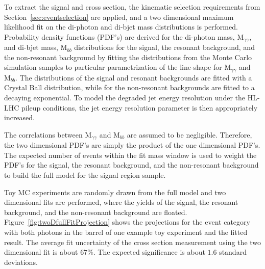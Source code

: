 To extract the signal and cross section, the kinematic selection requirements from Section~\ref{sec:eventselection} are applied, and  a two dimensional maximum
likelihood fit on the di-photon and di-bjet mass distributions is performed. Probability density functions (PDF's) are derived for the di-photon mass, $\mathrm{M}_{\gamma\gamma}$, and di-bjet mass, $\mathrm{M}_{bb}$
distributions for the signal, the resonant background, and the non-resonant background by 
fitting the distributions from the Monte Carlo simulation samples to particular parametrization 
of the line-shape for $\mathrm{M}_{\gamma\gamma}$ and $\mathrm{M}_{bb}$. The distributions of the signal and resonant backgrounds are fitted with a Crystal Ball distribution, while for
the non-resonant backgrounds are fitted to a decaying exponential. 
To model the degraded jet energy resolution under the HL-LHC pileup conditions, the jet energy resolution parameter is then appropriately increased.
 
The correlations between $\mathrm{M}_{\gamma\gamma}$ and $\mathrm{M}_{bb}$ are assumed to be negligible. Therefore, the two dimensional PDF's are simply the product of the one dimensional PDF's. The expected number of events within the fit mass window is used to weight the PDF's for the signal, the resonant background, and the non-resonant background to build the full model for the signal region sample. 

Toy MC experiments are randomly drawn from the full model and two dimensional fits are performed, where the yields of the signal, the resonant background, and the non-resonant background are floated.  Figure~\ref{fig:twoDfullFitProjection} shows the projections for the event category with both photons in the barrel of one example toy experiment and the fitted result. 
The average fit uncertainty of the cross section measurement using the two
dimensional fit is about $67\%$. The expected significance is about $1.6$ standard deviations. 

